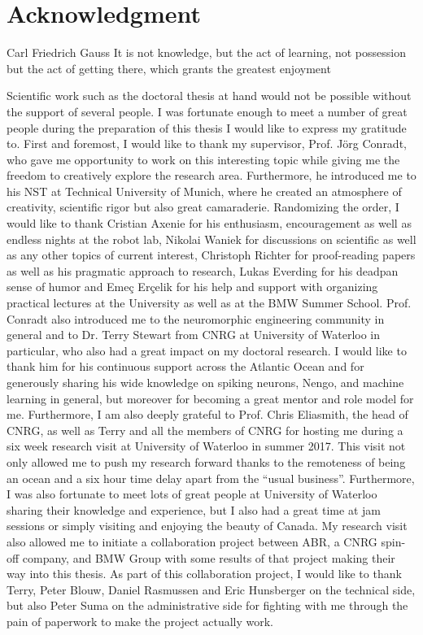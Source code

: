 \chapter*{Acknowledgment}
\begin{chapquote}{Carl Friedrich Gauss}
It is not knowledge, but the act of learning, not possession but the act of getting there, which grants the greatest enjoyment
\end{chapquote}

Scientific work such as the doctoral thesis at hand would not be possible without the support of several people.
I was fortunate enough to meet a number of great people during the preparation of this thesis I would like to express my gratitude to.
First and foremost, I would like to thank my supervisor, Prof. J\"org Conradt, who gave me opportunity to work on this interesting topic while giving me the freedom to creatively explore the research area.
Furthermore, he introduced me to his \acl{NST} at Technical University of Munich, where he created an atmosphere of creativity, scientific rigor but also great camaraderie.
Randomizing the order, I would like to thank Cristian Axenie for his enthusiasm, encouragement as well as endless nights at the robot lab, Nikolai Waniek for discussions on scientific as well as any other topics of current interest, Christoph Richter for proof-reading papers as well as his pragmatic approach to research, Lukas Everding for his deadpan sense of humor and Eme\c{c} Er\c{c}elik for his help and support with organizing practical lectures at the University as well as at the BMW Summer School.
Prof. Conradt also introduced me to the neuromorphic engineering community in general and to Dr. Terry Stewart from \ac{CNRG} at University of Waterloo in particular, who also had a great impact on my doctoral research.
I would like to thank him for his continuous support across the Atlantic Ocean and for generously sharing his wide knowledge on spiking neurons, Nengo, and machine learning in general, but moreover for becoming a great mentor and role model for me.
Furthermore, I am also deeply grateful to Prof. Chris Eliasmith, the head of \ac{CNRG}, as well as Terry and all the members of \ac{CNRG} for hosting me during a six week research visit at University of Waterloo in summer 2017.
This visit not only allowed me to push my research forward thanks to the remoteness of being an ocean and a six hour time delay apart from the \enquote{usual business}.
Furthermore, I was also fortunate to meet lots of great people at University of Waterloo sharing their knowledge and experience, but I also had a great time at jam sessions or simply visiting and enjoying the beauty of Canada.
My research visit also allowed me to initiate a collaboration project between \ac{ABR}, a \ac{CNRG} spin-off company, and BMW Group with some results of that project making their way into this thesis.
As part of this collaboration project, I would like to thank Terry, Peter Blouw, Daniel Rasmussen and Eric Hunsberger on the technical side, but also Peter Suma on the administrative side for fighting with me through the pain of paperwork to make the project actually work.

